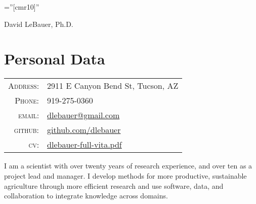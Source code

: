 \documentclass[a4paper,10pt]{article}
\begin{document}

\pagestyle{empty} %

\font\fb=''[cmr10]'' %

\par{\centering
		{\Huge David LeBauer, Ph.D.
	}\bigskip\par}

\section{Personal Data}

\begin{tabular}{rl}
    \textsc{Address:}   & 2911 E Canyon Bend St, Tucson, AZ \\
    \textsc{Phone:}     & 919-275-0360\\
    \textsc{email:}     &   
        \href{mailto:dlebauer@gmail.com}{dlebauer@gmail.com}\\
    \textsc{github:}    &     
        \href{https://github.com/dlebauer}{github.com/dlebauer}\\
    \textsc{cv:}        &
        \href{https://github.com/dlebauer/vita/raw/master/dlebauer-full-vita.pdf}{dlebauer-full-vita.pdf}

\end{tabular}

I am a scientist with over twenty years of research experience, and over ten as a project lead and manager. 
I develop methods for more productive, sustainable agriculture through more efficient research and use software, data, and collaboration to integrate knowledge across domains.
\end{document}
